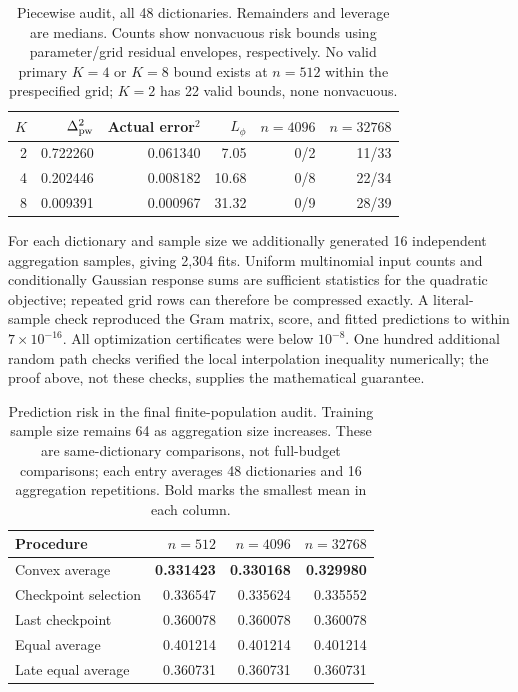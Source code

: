 \documentclass[pdflatex,sn-mathphys-ay]{sn-jnl}
\theoremstyle{remark}\newtheorem{remark}[theorem]{Remark}
\begin{document}
\begin{table}[htbp]\centering\small
\caption{Piecewise audit, all 48 dictionaries. Remainders and leverage are medians. Counts show nonvacuous risk bounds using parameter/grid residual envelopes, respectively. No valid primary $K=4$ or $K=8$ bound exists at $n=512$ within the prespecified grid; $K=2$ has 22 valid bounds, none nonvacuous.}\label{tab:piecewise}
\begin{tabular}{rrrrrr}\toprule
$K$ & $\Delta_{\rm pw}^2$ & Actual error$^2$ & $L_\phi$ & $n=4096$ & $n=32768$\\\midrule
2 & 0.722260 & 0.061340 & 7.05 & 0/2 & 11/33\\
4 & 0.202446 & 0.008182 & 10.68 & 0/8 & 22/34\\
8 & 0.009391 & 0.000967 & 31.32 & 0/9 & 28/39\\\bottomrule
\end{tabular}\end{table}

For each dictionary and sample size we additionally generated 16 independent aggregation samples, giving 2,304 fits. Uniform multinomial input counts and conditionally Gaussian response sums are sufficient statistics for the quadratic objective; repeated grid rows can therefore be compressed exactly. A literal-sample check reproduced the Gram matrix, score, and fitted predictions to within $7\times10^{-16}$. All optimization certificates were below $10^{-8}$. One hundred additional random path checks verified the local interpolation inequality numerically; the proof above, not these checks, supplies the mathematical guarantee.

\begin{table}[htbp]\centering\small
\caption{Prediction risk in the final finite-population audit. Training sample size remains 64 as aggregation size increases. These are same-dictionary comparisons, not full-budget comparisons; each entry averages 48 dictionaries and 16 aggregation repetitions. Bold marks the smallest mean in each column.}\label{tab:finalpred}
\begin{tabular}{lrrr}\toprule
Procedure & $n=512$ & $n=4096$ & $n=32768$\\\midrule
Convex average & \textbf{0.331423} & \textbf{0.330168} & \textbf{0.329980}\\
Checkpoint selection & 0.336547 & 0.335624 & 0.335552\\
Last checkpoint & 0.360078 & 0.360078 & 0.360078\\
Equal average & 0.401214 & 0.401214 & 0.401214\\
Late equal average & 0.360731 & 0.360731 & 0.360731\\\bottomrule
\end{tabular}\end{table}
\end{document}
